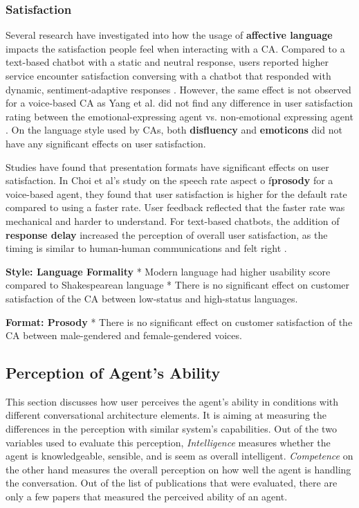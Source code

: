 \documentclass[sigconf,screen,review, anonymous]{acmart}
\newcommand{\cmt}[1]{}%
\begin{document}
\subsubsection{Satisfaction}
Several research have investigated into how the usage of \textbf{affective language} impacts the satisfaction people feel when interacting with a CA. Compared to a text-based chatbot with a static and neutral response, users reported higher service encounter satisfaction conversing with a chatbot that responded with dynamic, sentiment-adaptive responses \cite{diederich2019emulating}\cmt{[25]}. However, the same effect is not observed for a voice-based CA as Yang et al. did not find any difference in user satisfaction rating between the emotional-expressing agent vs. non-emotional expressing agent \cite{yang2017perceived}\cmt{[44]}. On the language style used by CAs, both \textbf{disfluency} \cite{pfeifer2009should}\cmt{[12]} and \textbf{emoticons} \cite{wilhelm2022keep}\cmt{[28]} did not have any significant effects on user satisfaction.

Studies have found that presentation formats have significant effects on user satisfaction. In Choi et al's study \cite{choi2020nobody}\cmt{[54]} on the speech rate aspect o f\textbf{prosody} for a voice-based agent, they found that user satisfaction is higher for the default rate compared to using a faster rate. User feedback reflected that the faster rate was mechanical and harder to understand. For text-based chatbots, the addition of \textbf{response delay} increased the perception of overall user satisfaction, as the timing is similar to human-human communications and felt right \cite{gnewuch2018faster}\cmt{[19]}. 

\textbf{Style: Language Formality}
* Modern language had higher usability score compared to Shakespearean language \cite{elsholz2019exploring}\cmt{[61]}
* There is no significant effect on customer satisfaction of the CA between low-status and high-status languages. \cite{habler2019effects}\cmt{[63]}

\textbf{Format: Prosody}
* There is no significant effect on customer satisfaction of the CA between male-gendered and female-gendered voices. \cite{habler2019effects}\cmt{[63]}

\subsection{Perception of Agent's Ability}

This section discusses how user perceives the agent's ability in conditions with different conversational architecture elements. It is aiming at measuring the differences in the perception with similar system's capabilities. Out of the two variables used to evaluate this perception, \textit{Intelligence} measures whether the agent is knowledgeable, sensible, and is seem as overall intelligent. \textit{Competence} on the other hand measures the overall perception on how well the agent is handling the conversation. Out of the list of publications that were evaluated, there are only a few papers that measured the perceived ability of an agent.
\end{document}
